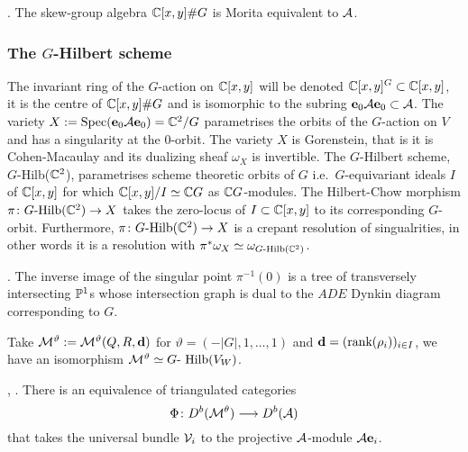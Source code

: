 \documentclass{amsart}
\theoremstyle{definition}
\newcommand\VW{V_W}
\begin{document}
\begin{theorem}\cite{MR2593679}.
The skew-group algebra $\mathbb{C}[x,y] \# G$ is Morita equivalent to $\mathcal{A}$.
\end{theorem}

\subsubsection{The $G$-Hilbert scheme}

The invariant ring of the $G$-action on $\mathbb{C}[x,y]$ will be denoted $\mathbb{C}[x,y]^G \subset \mathbb{C}[x,y]$, it is the centre of $\mathbb{C}[x,y] \# G$ and is isomorphic to the subring $\mathbf{e}_0 \mathcal{A} \mathbf{e}_0 \subset \mathcal{A}$.
The variety $X:= \operatorname{Spec}(\mathbf{e}_0 \mathcal{A} \mathbf{e}_0)=\mathbb{C}^2/G$ parametrises the orbits of the $G$-action on $V$ and has a singularity at the $0$-orbit.
The variety $X$ is Gorenstein, that is it is Cohen-Macaulay and its dualizing sheaf $\omega_X$ is invertible.
The $G$-Hilbert scheme, $G$-Hilb($\mathbb{C}^2$), parametrises scheme theoretic orbits of $G$ i.e.\ $G$-equivariant ideals $I$ of $\mathbb{C}[x,y]$ for which $\mathbb{C}[x,y]/I \simeq \mathbb{C} G$ as $\mathbb{C} G$-modules.
The Hilbert-Chow morphism $\pi \colon G\text{-Hilb}(\mathbb{C}^2) \rightarrow X$ takes the zero-locus of $I \subset \mathbb{C}[x,y]$ to its corresponding $G$-orbit.
Furthermore, $\pi \colon G\text{-Hilb}(\mathbb{C}^2) \rightarrow X$ is a crepant resolution of singualrities, in other words it is a resolution with $\pi^*\omega_X \simeq \omega_{G\text{-Hilb}(\mathbb{C}^2)}$.

\begin{theorem}\cite{MR604577}.
The inverse image of the singular point $\pi^{-1}(0)$ is a tree of transversely intersecting $\mathbb{P}^1$s whose intersection graph is dual to the $ADE$ Dynkin diagram corresponding to $G$.
\end{theorem}

Take $\mathcal{M}^\vartheta:=\mathcal{M}^\vartheta(Q,R,\mathbf{d})$ for $\vartheta = (-|G|,1, \ldots, 1)$ and $\mathbf{d}=(\text{rank}(\rho_i))_{i \in I}$, we have an isomorphism $\cM^\vartheta \simeq G\text{- Hilb}(\VW)$.

\begin{theorem}\cite{MR740077}, \cite{MR1752785}.
There is an equivalence of triangulated categories $$\Phi \colon D^b(\mathcal{M}^\theta) \longrightarrow D^b(\mathcal{A})$$ that takes the universal bundle $\mathcal{V}_i$ to the projective $\mathcal{A}$-module $\mathcal{A}\mathbf{e}_i$.
\end{theorem}
\end{document}
